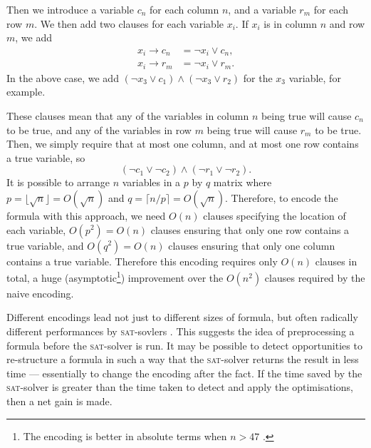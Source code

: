 \documentclass[proof,pdftex,11pt,a4,titlepage]{article}
\newcommand{\sat}{\textsc{sat}}
\begin{document}
Then we introduce a variable $c_n$ for each column $n$, and a variable $r_m$ for each row $m$. We then add two clauses for each variable $x_i$. If $x_i$ is in column $n$ and row $m$, we add
\begin{align*}
  x_i \to c_n &= \neg x_i \vee c_n, \\
  x_i \to r_m &= \neg x_i \vee r_m.
\end{align*}
In the above case, we add $(\neg x_3 \vee c_1) \wedge (\neg x_3 \vee r_2)$ for the $x_3$ variable, for example.

These clauses mean that any of the variables in column $n$ being true will cause $c_n$ to be true, and any of the variables in row $m$ being true will cause $r_m$ to be true. Then, we simply require that at most one column, and at most one row contains a true variable, so
\[(\neg c_1 \vee \neg c_2) \wedge (\neg r_1 \vee \neg r_2).\]
It is possible to arrange $n$ variables in a $p$ by $q$ matrix where $p = \lfloor \sqrt{n} \rfloor = O(\sqrt{n})$ and $q = \lceil n / p \rceil = O(\sqrt{n})$. Therefore, to encode the formula with this approach, we need $O(n)$ clauses specifying the location of each variable, $O(p^2)=O(n)$ clauses ensuring that only one row contains a true variable, and $O(q^2)=O(n)$ clauses ensuring that only one column contains a true variable. Therefore this encoding requires only $O(n)$ clauses in total, a huge (asymptotic\footnote{The encoding is better in absolute terms when $n>47$ \cite{Biere:2014}.}) improvement over the $O(n^2)$ clauses required by the naive encoding.

Different encodings lead not just to different sizes of formula, but often radically different performances by \sat{}-sovlers \cite{Martins:2011}. This suggests the idea of preprocessing a formula before the \sat{}-solver is run. It may be possible to detect opportunities to re-structure a formula in such a way that the \sat{}-solver returns the result in less time --- essentially to change the encoding after the fact. If the time saved by the \sat{}-solver is greater than the time taken to detect and apply the optimisations, then a net gain is made.
\end{document}
